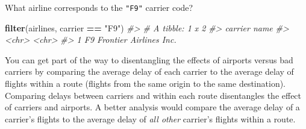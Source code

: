 \documentclass[]{book}
\newenvironment{Shaded}{\begin{snugshade}}{\end{snugshade}}
\newcommand{\CommentTok}[1]{\textcolor[rgb]{0.56,0.35,0.01}{\textit{#1}}}
\newcommand{\KeywordTok}[1]{\textcolor[rgb]{0.13,0.29,0.53}{\textbf{#1}}}
\newcommand{\NormalTok}[1]{#1}
\newcommand{\OperatorTok}[1]{\textcolor[rgb]{0.81,0.36,0.00}{\textbf{#1}}}
\newcommand{\StringTok}[1]{\textcolor[rgb]{0.31,0.60,0.02}{#1}}
\theoremstyle{plain}
\theoremstyle{remark}
\begin{document}
What airline corresponds to the \texttt{"F9"} carrier code?

\begin{Shaded}
\begin{Highlighting}[]
\KeywordTok{filter}\NormalTok{(airlines, carrier }\OperatorTok{==}\StringTok{ "F9"}\NormalTok{)}
\CommentTok{#> # A tibble: 1 x 2}
\CommentTok{#>   carrier name                  }
\CommentTok{#>   <chr>   <chr>                 }
\CommentTok{#> 1 F9      Frontier Airlines Inc.}
\end{Highlighting}
\end{Shaded}

You can get part of the way to disentangling the effects of airports versus bad carriers by comparing the average delay of each carrier to the average delay of flights within a route (flights from the same origin to the same destination).
Comparing delays between carriers and within each route disentangles the effect of carriers and airports.
A better analysis would compare the average delay of a carrier's flights to the average delay of \emph{all other} carrier's flights within a route.
\end{document}
